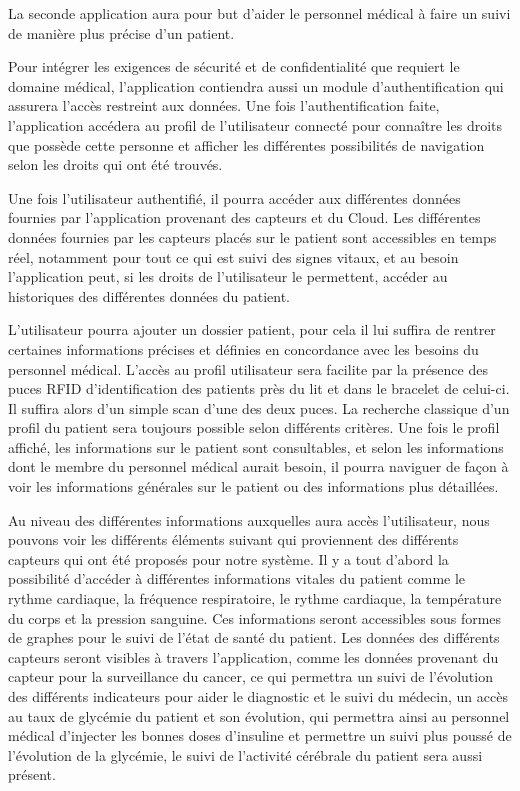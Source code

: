 La seconde application aura pour but d’aider le personnel médical à faire un suivi de manière plus précise d’un patient.

Pour intégrer les exigences de sécurité et de confidentialité que requiert le domaine médical, l’application contiendra aussi un module d’authentification qui assurera l’accès restreint aux données. Une fois l’authentification faite, l’application accédera au profil de l’utilisateur connecté pour connaître les droits que possède cette personne et afficher les différentes possibilités de navigation selon les droits qui ont été trouvés.

Une fois l’utilisateur authentifié, il pourra accéder aux différentes données fournies par l’application provenant des capteurs et du Cloud. Les différentes données fournies par les capteurs placés sur le patient sont accessibles en temps réel, notamment pour tout ce qui est suivi des signes vitaux, et au besoin l’application peut, si les droits de l’utilisateur le permettent, accéder au historiques des différentes données du patient.

L’utilisateur pourra ajouter un dossier patient, pour cela il lui suffira de rentrer certaines informations précises et définies en concordance avec les besoins du personnel médical. L’accès au profil utilisateur sera facilite par la présence des puces RFID d’identification des patients près du lit et dans le bracelet de celui-ci. Il suffira alors d’un simple scan d’une des deux puces. La recherche classique d’un profil du patient sera toujours possible selon différents critères. Une fois le profil affiché, les informations sur le patient sont consultables, et selon les informations dont le membre du personnel médical aurait besoin, il pourra naviguer de façon à voir les informations générales sur le patient ou des informations plus détaillées.

Au niveau des différentes informations auxquelles aura accès l’utilisateur, nous pouvons voir les différents éléments suivant qui
proviennent des différents capteurs qui ont été proposés pour notre système. Il y a tout d’abord la possibilité d’accéder à
différentes informations vitales du patient comme le rythme cardiaque, la fréquence respiratoire, le rythme cardiaque, la
température du corps et la pression sanguine. Ces informations seront accessibles sous formes de graphes pour le suivi de l’état
de santé du patient. Les données des différents capteurs seront visibles à travers l’application, comme les données provenant du capteur pour la surveillance du cancer, ce qui permettra un suivi de l’évolution des différents indicateurs pour aider le diagnostic et le suivi du médecin, un accès au taux de glycémie du patient et son évolution, qui permettra ainsi au personnel médical d’injecter les bonnes doses d’insuline et permettre un suivi plus poussé de l’évolution de la glycémie, le suivi de l’activité cérébrale du patient sera aussi présent.


